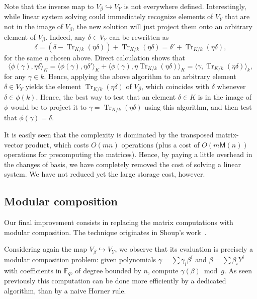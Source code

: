 \documentclass[12pt]{article}
\theoremstyle{plain}
\theoremstyle{definition}
\newcommand{\ang}[1]{\langle#1\rangle}
\DeclareMathOperator{\trace}{Tr} %
\def\F{\ensuremath{\mathbb{F}}}
\def\MM{\ensuremath{\mathsf{M}}}
\newcounter{algorithm}
\begin{document}
Note that the inverse map to $V_\beta\hookrightarrow V_Y$ is not
everywhere defined. %
Interestingly, while linear system solving could immediately recognize
elements of $V_Y$ that are not in the image of $V_\beta$, the new
solution will just project them onto an arbitrary element of
$V_\beta$. %
Indeed, any $\delta\in V_Y$ can be rewritten as
\begin{equation*}
  \delta = (\delta - \trace_{K/k}(\eta\delta)) + \trace_{K/k}(\eta\delta)
  = \delta' + \trace_{K/k}(\eta\delta),
\end{equation*}
for the same $\eta$ chosen above. %
Direct calculation shows that
\begin{equation}
  \label{eq:projection}
  \ang{\phi(\gamma),\eta\delta}_K =
  \ang{\phi(\gamma),\eta\delta'}_K + \ang{\phi(\gamma),\eta\trace_{K/k}(\eta\delta)}_K =
  \ang{\gamma, \trace_{K/k}(\eta\delta)}_k,
\end{equation}
for any $\gamma\in k$. %
Hence, applying the above algorithm to an arbitrary element
$\delta\in V_Y$ yields the element $\trace_{K/k}(\eta\delta)$ of
$V_\beta$, which coincides with $\delta$ whenever
$\delta\in\phi(k)$. %
Hence, the best way to test that an element $\delta\in K$ is in the
image of $\phi$ would be to project it to
$\gamma=\trace_{K/k}(\eta\delta)$ using this algorithm, and then test
that $\phi(\gamma)=\delta$.

It is easily seen that the complexity is dominated by the transposed
matrix-vector product, which costs $O(mn)$ operations (plus a cost of
$O(m\MM(n))$ operations for precomputing the matrices). %
Hence, by paying a little overhead in the changes of basis, we have
completely removed the cost of solving a linear system. %
We have not reduced yet the large storage cost, however.


\subsection{Modular composition}

Our final improvement consists in replacing the matrix computations
with modular composition. %
The technique originates in Shoup's
work~\cite{shoup94,shoup95,shoup99}.

Considering again the map $V_\beta\hookrightarrow V_Y$, we observe
that its evaluation is precisely a modular composition problem: given
polynomials $\gamma=\sum \gamma_i\beta^i$ and $\beta=\sum \beta_iY^i$
with coefficients in $\F_q$, of degree bounded by $n$, compute
$\gamma(\beta)\bmod g$. %
As seen previously this computation can be done more efficiently by a
dedicated algorithm, than by a naive Horner rule.
\end{document}
